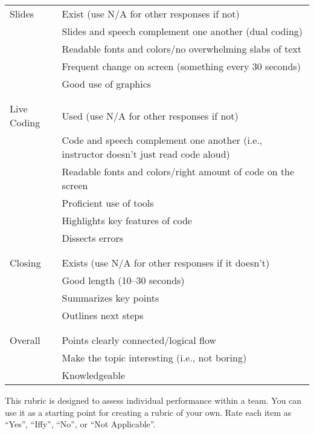 \begin{longtable}{p{}p{}}
  Slides
  & Exist (use N/A for other responses if not) \\
  & Slides and speech complement one another (dual coding) \\
  & Readable fonts and colors/no overwhelming slabs of text \\
  & Frequent change on screen (something every 30 seconds) \\
  & Good use of graphics \\
  \\ [-1.5ex] \hline \\ [-1.5ex]

  Live Coding
  & Used (use N/A for other responses if not) \\
  & Code and speech complement one another (i.e., instructor doesn't just read code aloud) \\
  & Readable fonts and colors/right amount of code on the screen \\
  & Proficient use of tools \\
  & Highlights key features of code \\
  & Dissects errors \\
  \\ [-1.5ex] \hline \\ [-1.5ex]

  Closing
  & Exists (use N/A for other responses if it doesn't) \\
  & Good length (10--30 seconds) \\
  & Summarizes key points \\
  & Outlines next steps \\
  \\ [-1.5ex] \hline \\ [-1.5ex]

  Overall
  & Points clearly connected/logical flow \\
  & Make the topic interesting (i.e., not boring) \\
  & Knowledgeable \\

\end{longtable}


This rubric is designed to assess individual performance within a
team. You can use it as a starting point for creating a rubric of
your own. Rate each item as ``Yes'', ``Iffy'', ``No'', or ``Not Applicable''.

